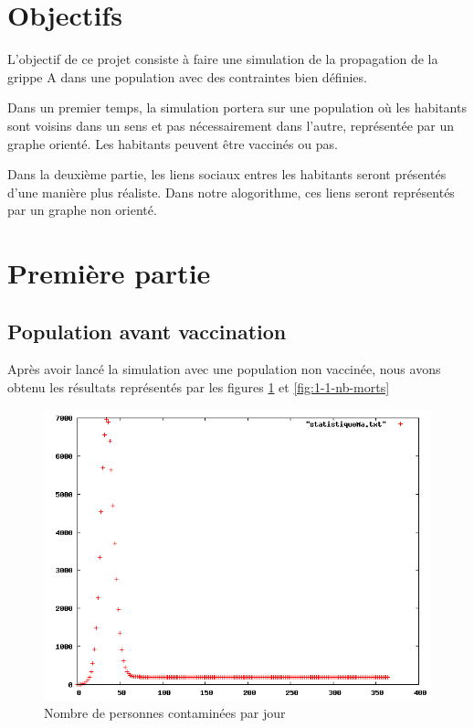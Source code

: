 \documentclass[12pt,a4paper,titlepage]{report}
\begin{document}

{}
\renewcommand\headrulewidth{2pt}


\section*{Objectifs}
\thispagestyle{fancy}
\par L'objectif de ce projet consiste à faire une simulation de la propagation de la grippe A dans une population avec des contraintes bien définies. 
\par Dans un premier temps, la simulation portera sur une population où les habitants sont voisins dans un sens et pas nécessairement dans l'autre, représentée par un graphe orienté. Les habitants peuvent être vaccinés ou pas. 
\par Dans la deuxième partie, les liens sociaux entres les habitants seront présentés d'une manière plus réaliste. Dans notre alogorithme, ces liens seront représentés par un graphe non orienté.


\section*{Première partie}
\subsection*{Population avant vaccination}
Après avoir lancé la simulation avec une population non vaccinée, nous avons obtenu 
les résultats représentés par les figures \ref{fig:1-1-nb-malades} et \ref{fig:1-1-nb-morts}   

\begin{figure}[htbp] 
  \centering
  \includegraphics[width=15cm]{1-1-statistiqueMa.png}
  \caption{Nombre de personnes contaminées par jour}
  \label{fig:1-1-nb-malades}
\end{figure}
\end{document}
